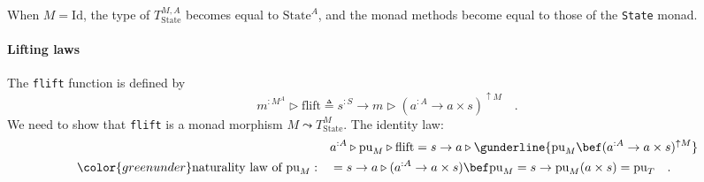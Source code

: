 When $M=\text{Id}$, the type of $T_{\text{State}}^{M,A}$ becomes
equal to $\text{State}^{A}$, and the monad methods become equal to
those of the \lstinline!State! monad.

\paragraph{Lifting laws}

The \lstinline!flift! function is defined by
\begin{equation}
m^{:M^{A}}\triangleright\text{flift}\triangleq s^{:S}\rightarrow m\triangleright(a^{:A}\rightarrow a\times s)^{\uparrow M}\quad.\label{eq:state-transformer-def-of-flift}
\end{equation}
We need to show that \lstinline!flift! is a monad morphism $M\leadsto T_{\text{State}}^{M}$.
The identity law:
\begin{align*}
 & a^{:A}\triangleright\text{pu}_{M}\triangleright\text{flift}=s\rightarrow a\triangleright\gunderline{\text{pu}_{M}\bef(a^{:A}\rightarrow a\times s)^{\uparrow M}}\\
{\color{greenunder}\text{naturality law of }\text{pu}_{M}:}\quad & =s\rightarrow a\triangleright(a^{:A}\rightarrow a\times s)\bef\text{pu}_{M}=s\rightarrow\text{pu}_{M}(a\times s)=\text{pu}_{T}\quad.
\end{align*}

